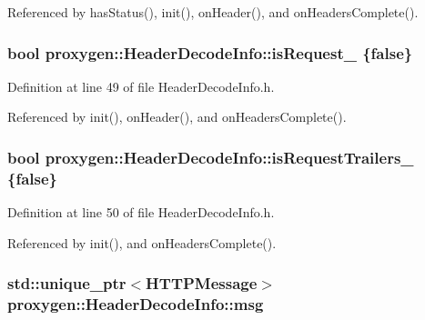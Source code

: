 Referenced by has\+Status(), init(), on\+Header(), and on\+Headers\+Complete().

\subsubsection[{is\+Request\+\_\+}]{\setlength{\rightskip}{0pt plus 5cm}bool proxygen\+::\+Header\+Decode\+Info\+::is\+Request\+\_\+ \{false\}\hspace{0.3cm}{\ttfamily [private]}}\label{classproxygen_1_1HeaderDecodeInfo_a00d0768c36e79101d800d300c9fd2612}


Definition at line 49 of file Header\+Decode\+Info.\+h.



Referenced by init(), on\+Header(), and on\+Headers\+Complete().

\subsubsection[{is\+Request\+Trailers\+\_\+}]{\setlength{\rightskip}{0pt plus 5cm}bool proxygen\+::\+Header\+Decode\+Info\+::is\+Request\+Trailers\+\_\+ \{false\}\hspace{0.3cm}{\ttfamily [private]}}\label{classproxygen_1_1HeaderDecodeInfo_ac647e1e441d03ec7a48dbde0ed4caa96}


Definition at line 50 of file Header\+Decode\+Info.\+h.



Referenced by init(), and on\+Headers\+Complete().

\subsubsection[{msg}]{\setlength{\rightskip}{0pt plus 5cm}std\+::unique\+\_\+ptr$<${\bf H\+T\+T\+P\+Message}$>$ proxygen\+::\+Header\+Decode\+Info\+::msg}\label{classproxygen_1_1HeaderDecodeInfo_ab2bd908e32fc3dc3164d9ddba192fa9a}


